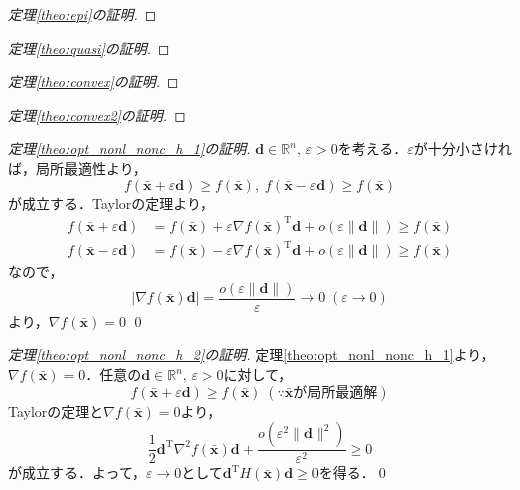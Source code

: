 \documentclass[dvipdfmx]{jsreport}
\begin{document}
\begin{proof}[定理\ref{theo:epi}の証明]

\end{proof}

\begin{proof}[定理\ref{theo:quasi}の証明]

\end{proof}

\begin{proof}[定理\ref{theo:convex}の証明]

\end{proof}

\begin{proof}[定理\ref{theo:convex2}の証明]

\end{proof}

\begin{proof}[定理\ref{theo:opt_nonl_nonc_h_1}の証明]
  $\bm{d} \in \mathbb{R}^n, \, \varepsilon > 0$を考える．$\varepsilon$が十分小さければ，局所最適性より，
  \begin{equation}
    f(\bar{\bm{x}} + \varepsilon \bm{d}) \geq f(\bar{\bm{x}}), \; f(\bar{\bm{x}} - \varepsilon \bm{d}) \geq f(\bar{\bm{x}}) \nonumber
  \end{equation}
  が成立する．Taylorの定理より，
  \begin{align}
    f(\bar{\bm{x}} + \varepsilon \bm{d}) &= f(\bar{\bm{x}}) + \varepsilon \nabla f(\bar{\bm{x}})^{\mathrm{T}}\bm{d} + o(\varepsilon\|\bm{d}\|) \geq f(\bar{\bm{x}}) \nonumber \\
    f(\bar{\bm{x}} - \varepsilon \bm{d}) &= f(\bar{\bm{x}}) - \varepsilon \nabla f(\bar{\bm{x}})^{\mathrm{T}}\bm{d} + o(\varepsilon\|\bm{d}\|) \geq f(\bar{\bm{x}}) \nonumber
  \end{align}
  なので，
  \begin{equation}
    |\nabla f(\bar{\bm{x}})\bm{d}| = \frac{o(\varepsilon \|\bm{d}\|)}{\varepsilon} \rightarrow 0 \; (\varepsilon \rightarrow 0) \nonumber
  \end{equation}
  より，$\nabla f(\bar{\bm{x}}) = 0$ \qed
\end{proof}

\begin{proof}[定理\ref{theo:opt_nonl_nonc_h_2}の証明]
  定理\ref{theo:opt_nonl_nonc_h_1}より，$\nabla f(\bar{\bm{x}}) = 0$．任意の$\bm{d} \in \mathbb{R}^n, \, \varepsilon > 0$に対して，
  \begin{equation}
    f(\bar{\bm{x}} + \varepsilon \bm{d}) \geq f(\bar{\bm{x}}) \; (\because \bar{\bm{x}}が局所最適解)\nonumber
  \end{equation}
  Taylorの定理と$\nabla f(\bar{\bm{x}}) = 0$より，
  \begin{equation}
    \frac{1}{2} \bm{d}^{\mathrm{T}} {\nabla}^2 f(\bar{\bm{x}}) \bm{d} + \frac{o({\varepsilon}^2 \|\bm{d}\|^2)}{{\varepsilon}^2} \geq 0 \nonumber
  \end{equation}
  が成立する．よって，$\varepsilon \rightarrow 0$として$\bm{d}^{\mathrm{T}} H(\bar{\bm{x}}) \bm{d} \geq 0$を得る．\qed
\end{proof}
\end{document}
